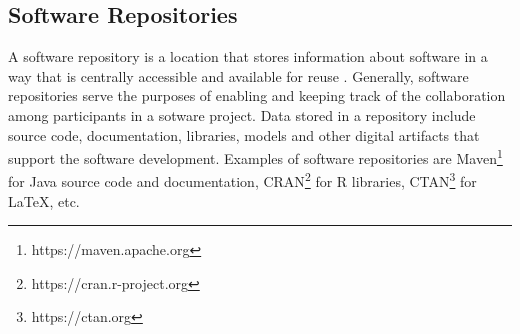 %
%



\subsection{Software Repositories}
\label{sec:software-repositories}

A software repository is a location that stores information about software \citep{oinas1999two,yamada2015classification} in a way that is centrally accessible and available for reuse \citep{DBLP:conf/sigsoft/MarcusM10}. Generally, software repositories serve the purposes of enabling \citep{DBLP:conf/itqm/SrinivasRR14} and keeping track of the collaboration among participants in a sotware project. Data stored in a repository include source code, documentation, libraries, models and other digital artifacts \citep{li2010measurement,DBLP:journals/infsof/SunLLLL15} that support the software development. Examples of software repositories are Maven\footnote{https://maven.apache.org} for Java source code and documentation, CRAN\footnote{https://cran.r-project.org} for R libraries, CTAN\footnote{https://ctan.org} for LaTeX, etc. 


